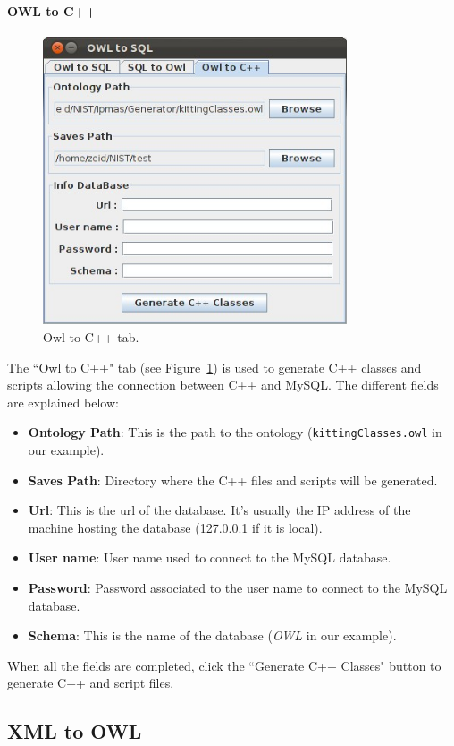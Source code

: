 \paragraph{OWL to C++}
\begin{figure}[h!t!]
\centering
\includegraphics[width=9cm]{Figure/OWL2C++.jpeg}
\caption{Owl to C++ tab.}
\label{fig:owl2C++}
\end{figure}
The ``Owl to C++" tab (see Figure~\ref{fig:owl2C++}) is used to generate C++ classes and scripts allowing the connection between C++ and MySQL. The different fields are explained below:
\begin{itemize}
\item \textbf{Ontology Path}: This is the path to the ontology (\texttt{kittingClasses.owl} in our example).
\item \textbf{Saves Path}: Directory where the C++ files and scripts will be generated.
\item \textbf{Url}: This is the url of the database. It's usually the IP address of the machine hosting the database (127.0.0.1 if it is local).
\item \textbf{User name}: User name used to connect to the MySQL database.
\item \textbf{Password}: Password associated to the user name to connect to the MySQL database.
\item \textbf{Schema}: This is the name of the database (\textit{OWL} in our example).
\end{itemize}

When all the fields are completed, click the ``Generate C++ Classes" button to generate C++ and script files.

\subsection{XML to OWL}\label{xml2owl}

